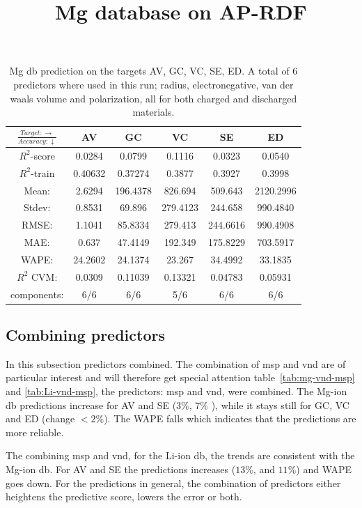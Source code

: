 \begin{table}[htbp]
\normalsize
\centering
\caption{Mg db prediction on the targets AV, GC, VC, SE, ED. A total of 6 predictors where used in this run; radius, electronegative, van der waals volume and polarization, all for both charged and discharged materials. }
\title{Mg database on AP-RDF}
\begin{tabular}{|c|c|c|c|c|c|}
	\hline 
	$\frac{Target: \rightarrow}{Accuracy:\downarrow} $ & AV & GC & VC & SE & ED 
	 \\ 	\hline
	$R^2$-score &  0.0284 & 0.0799 & 0.1116 &  0.0323 &  0.0540\\  \hline 
	$R^2$-train & 0.40632 &   0.37274 & 0.3877 &  0.3927 & 0.3998 \\ \hline
	Mean: & 2.6294&196.4378&826.694	&509.643	& 2120.2996	\\ \hline 
	Stdev: &0.8531	&69.896	&279.4123&244.658	&990.4840	\\ \hline 
	RMSE: &1.1041& 85.8334 &  279.413 &  244.6616 & 990.4908 \\ \hline
	MAE: & 0.637 & 47.4149& 192.349 &  175.8229 & 703.5917 \\  \hline
	WAPE: & 24.2602 & 24.1374 & 23.267  & 34.4992 & 33.1835 \\ \hline
	$R^2$ CVM: &  0.0309 & 0.11039 & 0.13321 & 0.04783 & 0.05931 \\	 \hline
	components: & 6/6 & 6/6  & 5/6   & 6/6 & 6/6  \\ 	\hline
\end{tabular}
\label{tab:Mg-APRDF1}
\end{table}

    

\FloatBarrier
\subsection{Combining predictors} 
In this subsection predictors combined. The combination of msp and vnd are of particular interest and will therefore get special attention 
 table \ref{tab:mg-vnd-msp} and \ref{tab:Li-vnd-msp}, the predictors: msp and vnd, were combined. The Mg-ion db predictions increase for AV and SE ($3\%$, $7\%$ ), while it stays still for GC, VC and ED (change $ < 2\%$). The WAPE falls which indicates that the predictions are more reliable.

The combining msp and vnd, for the Li-ion db, the trends are consistent with the Mg-ion db. For AV and SE the predictions increases ($13\%$, and $11\%$) and WAPE goes down. For the predictions in general, the combination of predictors either heightens the predictive score, lowers the error or both. 
 
